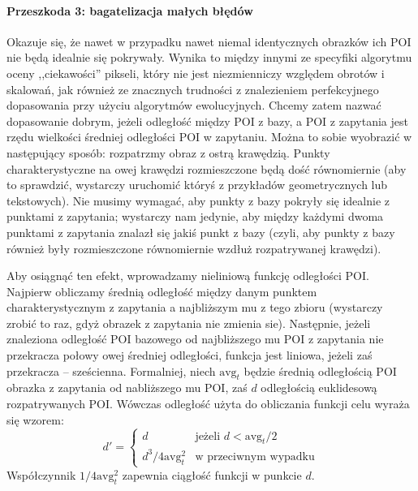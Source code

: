 \documentclass[a4paper,12pt,leqno]{article}
\begin{document}
\paragraph{Przeszkoda 3: bagatelizacja małych błędów}
Okazuje się, że nawet w przypadku nawet niemal identycznych obrazków ich POI nie będą idealnie się pokrywały. Wynika to między innymi ze specyfiki algorytmu oceny
,,ciekawości'' pikseli, który nie jest niezmienniczy względem obrotów i skalowań, jak również ze znacznych trudności z znalezieniem perfekcyjnego dopasowania przy
użyciu algorytmów ewolucyjnych. Chcemy zatem nazwać dopasowanie dobrym, jeżeli odległość między POI z bazy, a POI z zapytania jest rzędu wielkości średniej odległości
POI w zapytaniu. Można to sobie wyobrazić w następujący sposób: rozpatrzmy obraz z ostrą krawędzią. Punkty charakterystyczne na owej krawędzi rozmieszczone będą
dość równomiernie (aby to sprawdzić, wystarczy uruchomić któryś z przykładów geometrycznych lub tekstowych). Nie musimy wymagać, aby punkty z bazy pokryły się idealnie
z punktami z zapytania; wystarczy nam jedynie, aby między każdymi dwoma punktami z zapytania znalazł się jakiś punkt z bazy (czyli, aby punkty z bazy również były
rozmieszczone równomiernie wzdłuż rozpatrywanej krawędzi).

Aby osiągnąć ten efekt, wprowadzamy nieliniową funkcję odległości POI. Najpierw obliczamy średnią odległość między danym punktem charakterystycznym z zapytania a najbliższym mu z tego zbioru
(wystarczy zrobić to raz, gdyż obrazek z zapytania nie zmienia sie). Następnie, jeżeli znaleziona odległość POI bazowego od najbliższego mu POI z zapytania nie przekracza połowy
owej średniej odległości, funkcja jest liniowa, jeżeli zaś przekracza -- sześcienna. Formalniej, niech $\mathrm{avg}_t$ będzie średnią odległością POI obrazka 
z zapytania od nabliższego mu POI, zaś $d$ odległością euklidesową rozpatrywanych POI. Wówczas odległość użyta do obliczania funkcji celu wyraża się wzorem:
\[ d' = \begin{cases}
	    d & \text{jeżeli } d < \mathrm{avg}_t / 2 \\
	    d^3 / 4\mathrm{avg}_t^2 & \text{w przeciwnym wypadku}
	 \end{cases} \]
Współczynnik $1 / 4\mathrm{avg}_t^2$ zapewnia ciągłość funkcji w punkcie $d$.
\end{document}
